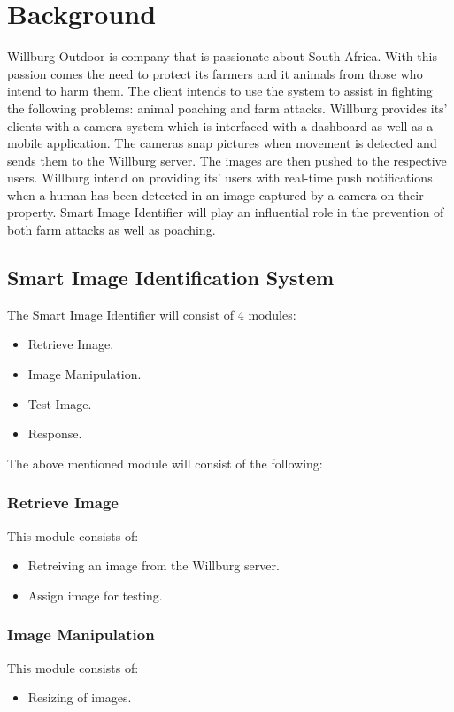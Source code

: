 \documentclass[a4paper,12pt]{report}
\begin{document}
\section {Background} \hfill \break
Willburg Outdoor is company that is passionate about South Africa. With this passion comes the need to protect its farmers and it animals from those who intend to harm them. The client intends to use the system to assist in fighting the following problems: animal poaching and farm attacks. 
Willburg provides its' clients with a camera system which is interfaced with a dashboard as well as a mobile application. The cameras snap pictures when movement is detected and sends them to the Willburg server. The images are then pushed to the respective users. Willburg intend on providing its' users with real-time push notifications when a human has been detected in an image captured by a camera on their property. Smart Image Identifier will play an influential role in the prevention of both farm attacks as well as poaching.

\subsection {Smart Image Identification System}
The Smart Image Identifier will consist of 4 modules:
	\begin {itemize}
		\item Retrieve Image.  
		\item Image Manipulation.
		\item Test Image.
		\item Response.
	\end {itemize}

The above mentioned module will consist of the following:
	\subsubsection {Retrieve Image}
		This module consists of:
			\begin {itemize}
				\item Retreiving an image from the Willburg server.
				\item Assign image for testing. 
			\end {itemize}

	\subsubsection {Image Manipulation}
		This module consists of:
			\begin {itemize}
				\item Resizing of images.
			\end {itemize}
\end{document}

